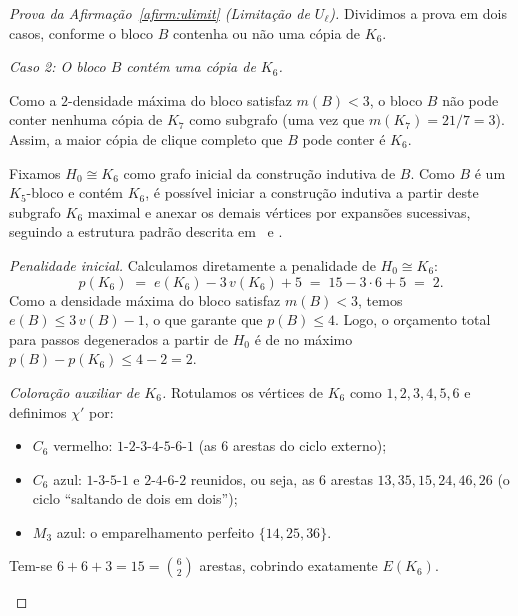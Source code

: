 \documentclass[reqno, 12pt]{amsart}
\numberwithin{equation}{section}
\theoremstyle{plain}
\theoremstyle{definition}
\newcommand{\maxdens}{m}
\begin{document}
\begin{proof}[Prova da Afirmação~\ref{afirm:ulimit} (Limitação de $U_\ell$)]
Dividimos a prova em dois casos, conforme o bloco $B$ contenha ou não uma cópia de $K_6$.

\medskip
\noindent\textit{Caso 2: O bloco $B$ contém uma cópia de $K_6$.}

\medskip

Como a $2$-densidade máxima do bloco satisfaz $\maxdens(B) < 3$, o bloco $B$ não pode conter nenhuma cópia de $K_7$ como subgrafo (uma vez que $m(K_7) = 21/7 = 3$). Assim, a maior cópia de clique completo que $B$ pode conter é $K_6$.

Fixamos $H_0 \cong K_6$ como grafo inicial da construção indutiva de $B$. Como $B$ é um $K_5$-bloco e contém $K_6$, é possível iniciar a construção indutiva a partir deste subgrafo $K_6$ maximal e anexar os demais vértices por expansões sucessivas, seguindo a estrutura padrão descrita em~\cite{nenadov2017algorithmic} e \cite{AntiComplete}.

\medskip
\noindent\textit{Penalidade inicial.}
Calculamos diretamente a penalidade de $H_0 \cong K_6$:
\[
  p(K_6) \;=\; e(K_6) - 3\,v(K_6) + 5 \;=\; 15 - 3 \cdot 6 + 5 \;=\; 2.
\]
Como a densidade máxima do bloco satisfaz $\maxdens(B) < 3$, temos $e(B) \le 3\,v(B) - 1$, o que garante que $p(B) \le 4$. Logo, o orçamento total para passos degenerados a partir de $H_0$ é de no máximo $p(B) - p(K_6) \le 4 - 2 = 2$.

\medskip
\noindent\textit{Coloração auxiliar de $K_6$.}
Rotulamos os vértices de $K_6$ como $1, 2, 3, 4, 5, 6$ e definimos $\chi'$ por:
\begin{itemize}
  \item $C_6$ vermelho: $1\text{-}2\text{-}3\text{-}4\text{-}5\text{-}6\text{-}1$
        (as $6$ arestas do ciclo externo);
  \item $C_6$ azul: $1\text{-}3\text{-}5\text{-}1$ e $2\text{-}4\text{-}6\text{-}2$
        reunidos, ou seja, as $6$ arestas $13, 35, 15, 24, 46, 26$
        (o ciclo ``saltando de dois em dois'');
  \item $M_3$ azul: o emparelhamento perfeito $\{14, 25, 36\}$.
\end{itemize}
Tem-se $6 + 6 + 3 = 15 = \binom{6}{2}$ arestas, cobrindo exatamente $E(K_6)$.

\medskip

\begin{center}
\begin{tikzpicture}[scale=1.2,
  vm/.style={draw=red!70!black, very thick},
  az/.style={draw=blue!70!black, very thick, dashed},
  vert/.style={circle, fill=black, inner sep=1.8pt}]


\end{tikzpicture}
\end{center}
\end{proof}
\end{document}
